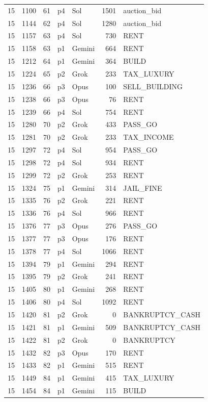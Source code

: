 \begin{longtable}{r r r l l r >{\ttfamily}l}
15 & 1100 & 61 & p4 & Sol & 1501 & auction\_bid \\
15 & 1144 & 62 & p4 & Sol & 1280 & auction\_bid \\
15 & 1157 & 63 & p4 & Sol & 730 & RENT \\
15 & 1158 & 63 & p1 & Gemini & 664 & RENT \\
15 & 1212 & 64 & p1 & Gemini & 364 & BUILD \\
15 & 1224 & 65 & p2 & Grok & 233 & TAX\_LUXURY \\
15 & 1236 & 66 & p3 & Opus & 100 & SELL\_BUILDING \\
15 & 1238 & 66 & p3 & Opus & 76 & RENT \\
15 & 1239 & 66 & p4 & Sol & 754 & RENT \\
15 & 1280 & 70 & p2 & Grok & 433 & PASS\_GO \\
15 & 1281 & 70 & p2 & Grok & 233 & TAX\_INCOME \\
15 & 1297 & 72 & p4 & Sol & 954 & PASS\_GO \\
15 & 1298 & 72 & p4 & Sol & 934 & RENT \\
15 & 1299 & 72 & p2 & Grok & 253 & RENT \\
15 & 1324 & 75 & p1 & Gemini & 314 & JAIL\_FINE \\
15 & 1335 & 76 & p2 & Grok & 221 & RENT \\
15 & 1336 & 76 & p4 & Sol & 966 & RENT \\
15 & 1376 & 77 & p3 & Opus & 276 & PASS\_GO \\
15 & 1377 & 77 & p3 & Opus & 176 & RENT \\
15 & 1378 & 77 & p4 & Sol & 1066 & RENT \\
15 & 1394 & 79 & p1 & Gemini & 294 & RENT \\
15 & 1395 & 79 & p2 & Grok & 241 & RENT \\
15 & 1405 & 80 & p1 & Gemini & 268 & RENT \\
15 & 1406 & 80 & p4 & Sol & 1092 & RENT \\
15 & 1420 & 81 & p2 & Grok & 0 & BANKRUPTCY\_CASH \\
15 & 1421 & 81 & p1 & Gemini & 509 & BANKRUPTCY\_CASH \\
15 & 1422 & 81 & p2 & Grok & 0 & BANKRUPTCY \\
15 & 1432 & 82 & p3 & Opus & 170 & RENT \\
15 & 1433 & 82 & p1 & Gemini & 515 & RENT \\
15 & 1449 & 84 & p1 & Gemini & 415 & TAX\_LUXURY \\
15 & 1454 & 84 & p1 & Gemini & 115 & BUILD \\

\end{longtable}
